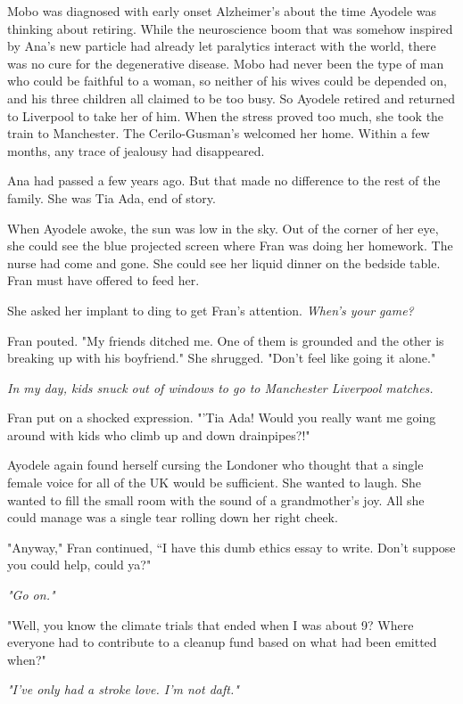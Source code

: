 \documentclass{article}
\begin{document}
Mobo was diagnosed with early onset Alzheimer’s about the time Ayodele was thinking about retiring. While the neuroscience boom that was somehow inspired by Ana's new particle had already let paralytics interact with the world, there was no cure for the degenerative disease. Mobo had never been the type of man who could be faithful to a woman, so neither of his wives could be depended on, and his three children all claimed to be too busy. So Ayodele retired and returned to Liverpool to take her of him. When the stress proved too much, she took the train to Manchester. The Cerilo-Gusman's welcomed her home. Within a few months, any trace of jealousy had disappeared. 

Ana had passed a few years ago. But that made no difference to the rest of the family. She was Tia Ada, end of story.

When Ayodele awoke, the sun was low in the sky. Out of the corner of her eye, she could see the blue projected screen where Fran was doing her homework. The nurse had come and gone. She could see her liquid dinner on the bedside table. Fran must have offered to feed her.

She asked her implant to ding to get Fran's attention. \emph{When's your game?}

Fran pouted. "My friends ditched me. One of them is grounded and the other is breaking up with his boyfriend." She shrugged. "Don't feel like going it alone."

\emph{In my day, kids snuck out of windows to go to Manchester Liverpool matches.}

Fran put on a shocked expression. "'Tia Ada! Would you really want me going around with kids who climb up and down drainpipes?!"

Ayodele again found herself cursing the Londoner who thought that a single female voice for all of the UK would be sufficient. She wanted to laugh. She wanted to fill the small room with the sound of a grandmother's joy. All she could manage was a single tear rolling down her right cheek.

"Anyway," Fran continued, “I have this dumb ethics essay to write. Don't suppose you could help, could ya?"

\emph{"Go on."}

"Well, you know the climate trials that ended when I was about 9? Where everyone had to contribute to a cleanup fund based on what had been emitted when?"

\emph{"I've only had a stroke love. I'm not daft."}
\end{document}
